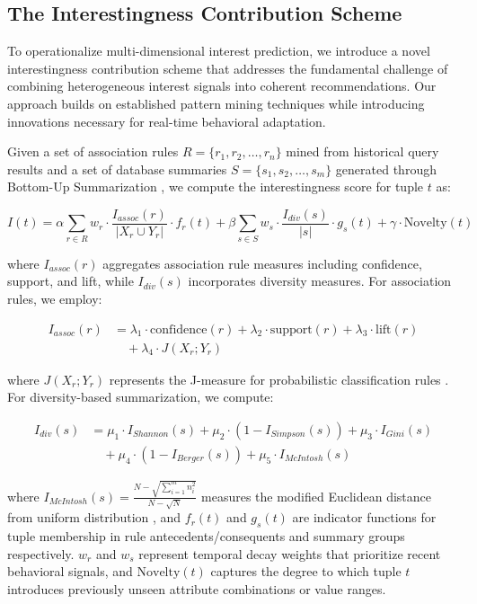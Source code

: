 \documentclass[sigconf, nonacm]{acmart}
\begin{document}
\subsection{The Interestingness Contribution Scheme}

To operationalize multi-dimensional interest prediction, we introduce a novel interestingness contribution scheme that addresses the fundamental challenge of combining heterogeneous interest signals into coherent recommendations. Our approach builds on established pattern mining techniques while introducing innovations necessary for real-time behavioral adaptation.

Given a set of association rules $R = \{r_1, r_2, \ldots, r_n\}$ mined from historical query results and a set of database summaries $S = \{s_1, s_2, \ldots, s_m\}$ generated through Bottom-Up Summarization \cite{chandola_summarizationcompressing_2007}, we compute the interestingness score for tuple $t$ as:

\begin{equation}
I(t) = \alpha \sum_{r\in R} w_r \cdot \frac{I_{assoc}(r)}{|X_r \cup Y_r|} \cdot f_r(t) + \beta \sum_{s\in S} w_s \cdot \frac{I_{div}(s)}{|s|} \cdot g_s(t) + \gamma \cdot \text{Novelty}(t)
\end{equation}

where $I_{assoc}(r)$ aggregates association rule measures including confidence, support, and lift, while $I_{div}(s)$ incorporates diversity measures. For association rules, we employ:

\begin{align}
I_{assoc}(r) &= \lambda_1 \cdot \text{confidence}(r) + \lambda_2 \cdot \text{support}(r) + \lambda_3 \cdot \text{lift}(r) \\
&\quad + \lambda_4 \cdot J(X_r; Y_r)
\end{align}

where $J(X_r; Y_r)$ represents the J-measure for probabilistic classification rules \cite{goodman1991rule}. For diversity-based summarization, we compute:

\begin{align}
I_{div}(s) &= \mu_1 \cdot I_{Shannon}(s) + \mu_2 \cdot (1 - I_{Simpson}(s)) + \mu_3 \cdot I_{Gini}(s) \\
&\quad + \mu_4 \cdot (1 - I_{Berger}(s)) + \mu_5 \cdot I_{McIntosh}(s)
\end{align}

where $I_{McIntosh}(s) = \frac{N - \sqrt{\sum_{i=1}^m n_i^2}}{N - \sqrt{N}}$ measures the modified Euclidean distance from uniform distribution \cite{mcintoshIndexDiversityRelation1967}, and $f_r(t)$ and $g_s(t)$ are indicator functions for tuple membership in rule antecedents/consequents and summary groups respectively. $w_r$ and $w_s$ represent temporal decay weights that prioritize recent behavioral signals, and $\text{Novelty}(t)$ captures the degree to which tuple $t$ introduces previously unseen attribute combinations or value ranges.
\end{document}

